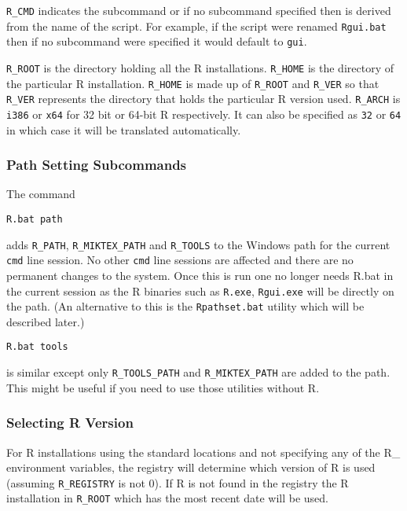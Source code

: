 \texttt{R\_CMD} indicates the subcommand or if no subcommand specified
then is derived from the name of the script. For example, if the script
were renamed \texttt{Rgui.bat} then if no subcommand were specified it
would default to \texttt{gui}.

\texttt{R\_ROOT} is the directory holding all the R installations.
\texttt{R\_HOME} is the directory of the particular R installation.
\texttt{R\_HOME} is made up of \texttt{R\_ROOT} and \texttt{R\_VER} so
that \texttt{R\_VER} represents the directory that holds the particular
R version used. \texttt{R\_ARCH} is \texttt{i386} or \texttt{x64} for 32
bit or 64-bit R respectively. It can also be specified as \texttt{32} or
\texttt{64} in which case it will be translated automatically.

\subsubsection{Path Setting Subcommands}

The command

\begin{verbatim}
R.bat path
\end{verbatim}

adds \texttt{R\_PATH}, \texttt{R\_MIKTEX\_PATH} and \texttt{R\_TOOLS} to
the Windows path for the current \texttt{cmd} line session. No other
\texttt{cmd} line sessions are affected and there are no permanent
changes to the system. Once this is run one no longer needs R.bat in the
current session as the R binaries such as \texttt{R.exe},
\texttt{Rgui.exe} will be directly on the path. (An alternative to this
is the \texttt{Rpathset.bat} utility which will be described later.)

\begin{verbatim}
R.bat tools
\end{verbatim}

is similar except only \texttt{R\_TOOLS\_PATH} and
\texttt{R\_MIKTEX\_PATH} are added to the path. This might be useful if
you need to use those utilities without R.

\subsubsection{Selecting R Version}

For R installations using the standard locations and not specifying any
of the R\_ environment variables, the registry will determine which
version of R is used (assuming \texttt{R\_REGISTRY} is not 0). If R is
not found in the registry the R installation in \texttt{R\_ROOT} which
has the most recent date will be used.

